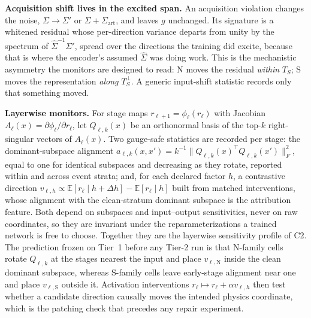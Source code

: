 \documentclass[10pt,twocolumn]{extarticle}
\begin{document}
\textbf{Acquisition shift lives in the excited span.} An acquisition violation
changes the noise, $\Sigma\to\Sigma'$ or $\Sigma+\Sigma_{\mathrm{art}}$, and
leaves $g$ unchanged. Its signature is a whitened residual whose per-direction
variance departs from unity by the spectrum of $\hat\Sigma^{-1}\Sigma'$, spread
over the directions the training did excite, because that is where the
encoder's assumed $\hat\Sigma$ was doing work. This is the mechanistic
asymmetry the monitors are designed to read: N moves the residual \emph{within}
$T_S$; S moves the representation \emph{along} $T_S^{\perp}$. A generic
input-shift statistic records only that something moved.

\textbf{Layerwise monitors.} For stage maps $r_{\ell+1}=\phi_\ell(r_\ell)$ with
Jacobian $A_\ell(x)=\partial\phi_\ell/\partial r_\ell$, let $Q_{\ell,k}(x)$ be
an orthonormal basis of the top-$k$ right-singular vectors of $A_\ell(x)$. Two
gauge-safe statistics are recorded per stage: the dominant-subspace alignment
$a_{\ell,k}(x,x')=k^{-1}\|Q_{\ell,k}(x)^{\top}Q_{\ell,k}(x')\|_F^{2}$, equal to
one for identical subspaces and decreasing as they rotate, reported within and
across event strata; and, for each declared factor $h$, a contrastive
direction $v_{\ell,h}\propto\mathbb E[r_\ell\mid h{+}\Delta h]-\mathbb E[r_\ell\mid h]$
built from matched interventions, whose alignment with the clean-stratum
dominant subspace is the attribution feature. Both depend on subspaces and
input--output sensitivities, never on raw coordinates, so they are invariant
under the reparameterizations a trained network is free to choose. Together
they are the layerwise sensitivity profile of C2. The prediction frozen on
Tier~1 before any Tier-2 run is that N-family cells rotate $Q_{\ell,k}$ at the
stages nearest the input and place $v_{\ell,\mathrm N}$ inside the clean
dominant subspace, whereas S-family cells leave early-stage alignment near one
and place $v_{\ell,\mathrm S}$ outside it. Activation interventions
$r_\ell\mapsto r_\ell+\alpha v_{\ell,h}$ then test whether a candidate
direction causally moves the intended physics coordinate, which is the
patching check that precedes any repair experiment.
\end{document}
